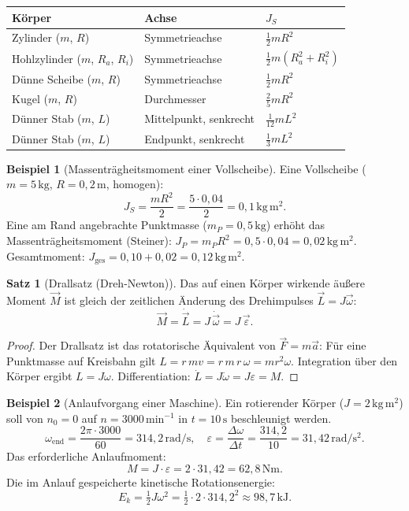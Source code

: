 ﻿\documentclass[a4paper,12pt]{report}
\theoremstyle{definition}
\newtheorem{beispiel}{Beispiel}
\newtheorem{satz}{Satz}
\begin{document}
\begin{center}
\begin{tabular}{lll}
\toprule
K\"orper & Achse & $J_S$ \\
\midrule
Zylinder ($m$, $R$) & Symmetrieachse & $\frac{1}{2}mR^2$ \\
Hohlzylinder ($m$, $R_a$, $R_i$) & Symmetrieachse & $\frac{1}{2}m(R_a^2+R_i^2)$ \\
D\"unne Scheibe ($m$, $R$) & Symmetrieachse & $\frac{1}{2}mR^2$ \\
Kugel ($m$, $R$) & Durchmesser & $\frac{2}{5}mR^2$ \\
D\"unner Stab ($m$, $L$) & Mittelpunkt, senkrecht & $\frac{1}{12}mL^2$ \\
D\"unner Stab ($m$, $L$) & Endpunkt, senkrecht & $\frac{1}{3}mL^2$ \\
\bottomrule
\end{tabular}
\end{center}

\begin{beispiel}[Massentr\"agheitsmoment einer Vollscheibe]
Eine Vollscheibe ($m = 5\,\mathrm{kg}$, $R = 0{,}2\,\mathrm{m}$, homogen):
\[
  J_S = \frac{mR^2}{2} = \frac{5 \cdot 0{,}04}{2} = 0{,}1\,\mathrm{kg\,m^2}.
\]
Eine am Rand angebrachte Punktmasse ($m_P = 0{,}5\,\mathrm{kg}$) erh\"oht das
Massentr\"agheitsmoment (Steiner): $J_{P} = m_P R^2 = 0{,}5\cdot0{,}04 = 0{,}02\,\mathrm{kg\,m^2}$.
Gesamtmoment: $J_{\text{ges}} = 0{,}10 + 0{,}02 = 0{,}12\,\mathrm{kg\,m^2}$.
\end{beispiel}

\begin{satz}[Drallsatz (Dreh-Newton)]
Das auf einen K\"orper wirkende \"au\ss{}ere Moment $\vec{M}$ ist gleich
der zeitlichen \"Anderung des Drehimpulses $\vec{L} = J\vec{\omega}$:
\[
  \vec{M} = \dot{\vec{L}} = J\,\dot{\vec{\omega}} = J\,\vec{\varepsilon}.
\]
\end{satz}
\begin{proof}
Der Drallsatz ist das rotatorische \"Aquivalent von $\vec{F} = m\vec{a}$:
F\"ur eine Punktmasse auf Kreisbahn gilt $L = r\,mv = r\,m\,r\,\omega = mr^2\omega$.
Integration \"uber den K\"orper ergibt $L = J\omega$.
Differentiation: $\dot{L} = J\dot{\omega} = J\varepsilon = M$.
\end{proof}

\begin{beispiel}[Anlaufvorgang einer Maschine]
Ein rotierender K\"orper ($J = 2\,\mathrm{kg\,m^2}$) soll von $n_0 = 0$
auf $n = 3000\,\mathrm{min^{-1}}$ in $t = 10\,\mathrm{s}$ beschleunigt werden.
\[
  \omega_{\text{end}} = \frac{2\pi\cdot 3000}{60} = 314{,}2\,\mathrm{rad/s},
  \quad
  \varepsilon = \frac{\Delta\omega}{\Delta t} = \frac{314{,}2}{10} = 31{,}42\,\mathrm{rad/s^2}.
\]
Das erforderliche Anlaufmoment:
\[
  M = J\cdot\varepsilon = 2\cdot31{,}42 = 62{,}8\,\mathrm{Nm}.
\]
Die im Anlauf gespeicherte kinetische Rotationsenergie:
\[
  E_k = \tfrac{1}{2}J\omega^2 = \tfrac{1}{2}\cdot2\cdot314{,}2^2 \approx 98{,}7\,\mathrm{kJ}.
\]
\end{beispiel}
\end{document}
